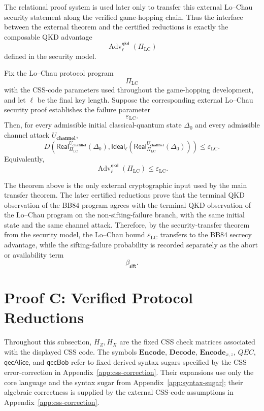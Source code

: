 \documentclass[acmsmall,screen,review,anonymous,nonacm]{acmart}
\theoremstyle{defn_style}
\begin{document}
The relational proof system is used later only to transfer this external
Lo--Chau security statement along the verified game-hopping chain.  Thus the
interface between the external theorem and the certified reductions is exactly
the composable QKD advantage
\[
\operatorname{Adv}^{\mathsf{qkd}}_{\ell}(\Pi_{\mathrm{LC}})
\]
defined in the security model.

\begin{theorem}
\label{thm:external-lo-chau-security}
Fix the Lo--Chau protocol program
\[
\Pi_{\mathrm{LC}}
\]
with the CSS-code parameters used throughout the game-hopping development, and
let \(\ell\) be the final key length.  Suppose the corresponding external
Lo--Chau security proof establishes the failure parameter
\[
\varepsilon_{\mathrm{LC}} .
\]
Then, for every admissible initial classical-quantum state \(\Delta_0\) and
every admissible channel attack \(U_{\textbf{channel}}\),
\[
D\left(
\mathsf{Real}_{\Pi_{\mathrm{LC}}}^{U_{\textbf{channel}}}(\Delta_0),
\mathsf{Ideal}_{\ell}
\left(
\mathsf{Real}_{\Pi_{\mathrm{LC}}}^{U_{\textbf{channel}}}(\Delta_0)
\right)
\right)
\leq
\varepsilon_{\mathrm{LC}} .
\]
Equivalently,
\[
\operatorname{Adv}^{\mathsf{qkd}}_{\ell}(\Pi_{\mathrm{LC}})
\leq
\varepsilon_{\mathrm{LC}} .
\]
\end{theorem}

The theorem above is the only external cryptographic input used by the main
transfer theorem.  The later certified reductions prove that the terminal QKD
observation of the BB84 program agrees with the terminal QKD observation of
the Lo--Chau program on the non-sifting-failure branch, with the same initial
state and the same channel attack.  Therefore, by the security-transfer theorem
from the security model, the Lo--Chau bound
\(\varepsilon_{\mathrm{LC}}\) transfers to the BB84 secrecy advantage, while the
sifting-failure probability is recorded separately as the abort or availability
term
\[
\beta_{\mathsf{sift}} .
\]
\newpage

\section{Proof C: Verified Protocol Reductions}

Throughout this subsection, \(H_Z,H_X\) are the fixed CSS check matrices
associated with the displayed CSS code. The symbols
\(\mathbf{Encode}\), \(\mathbf{Decode}\), \(\mathbf{Encode}_{x,z}\), \(QEC\),
\(\mathsf{qecAlice}\), and \(\mathsf{qecBob}\) refer to fixed derived syntax sugars
specified by the CSS error-correction in Appendix~\ref{app:css-correction}. Their expansions use only the core language and the
syntax sugar from Appendix~\ref{app:syntax-sugar}; their algebraic correctness
is supplied by the external CSS-code assumptions in
Appendix~\ref{app:css-correction}.
\end{document}
